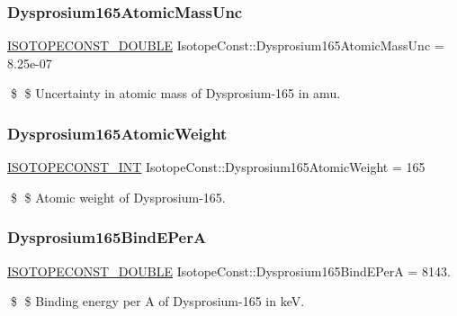 \subsubsection{\texorpdfstring{Dysprosium165\+Atomic\+Mass\+Unc}{Dysprosium165AtomicMassUnc}}
{\footnotesize\ttfamily \mbox{\hyperlink{group___isotope_const-_macros_ga8f45a7272ce02c0b4c65c44636ed719a}{I\+S\+O\+T\+O\+P\+E\+C\+O\+N\+S\+T\+\_\+\+D\+O\+U\+B\+LE}} Isotope\+Const\+::\+Dysprosium165\+Atomic\+Mass\+Unc = 8.\+25e-\/07}

\$ \$ Uncertainty in atomic mass of Dysprosium-\/165 in amu. \mbox{\label{group___isotope_const-_dysprosium-_dy165_gac6aa8d3dd90f3b25571a40b3e13487d6}} 
\subsubsection{\texorpdfstring{Dysprosium165\+Atomic\+Weight}{Dysprosium165AtomicWeight}}
{\footnotesize\ttfamily \mbox{\hyperlink{group___isotope_const-_macros_ga5f18360b3e99483a35c32d789e62621c}{I\+S\+O\+T\+O\+P\+E\+C\+O\+N\+S\+T\+\_\+\+I\+NT}} Isotope\+Const\+::\+Dysprosium165\+Atomic\+Weight = 165}

\$ \$ Atomic weight of Dysprosium-\/165. \mbox{\label{group___isotope_const-_dysprosium-_dy165_ga6fc8bd7eed4aef67e23b8da89e7e47f6}} 
\subsubsection{\texorpdfstring{Dysprosium165\+Bind\+E\+PerA}{Dysprosium165BindEPerA}}
{\footnotesize\ttfamily \mbox{\hyperlink{group___isotope_const-_macros_ga8f45a7272ce02c0b4c65c44636ed719a}{I\+S\+O\+T\+O\+P\+E\+C\+O\+N\+S\+T\+\_\+\+D\+O\+U\+B\+LE}} Isotope\+Const\+::\+Dysprosium165\+Bind\+E\+PerA = 8143.}

\$ \$ Binding energy per A of Dysprosium-\/165 in keV. \mbox{\label{group___isotope_const-_dysprosium-_dy165_ga3b20c3411048d0c933ecef3c04d6484a}} 
